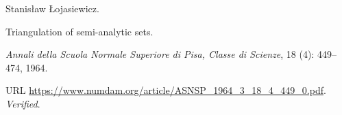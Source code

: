 Stanis{\l}aw {\L}ojasiewicz.

\newblock Triangulation of semi-analytic sets.

\newblock \emph{Annali della Scuola Normale Superiore di Pisa, Classe di
  Scienze}, 18 (4): 449--474, 1964.

\newblock URL \url{https://www.numdam.org/article/ASNSP_1964_3_18_4_449_0.pdf}.
\newblock \emph{Verified}.

